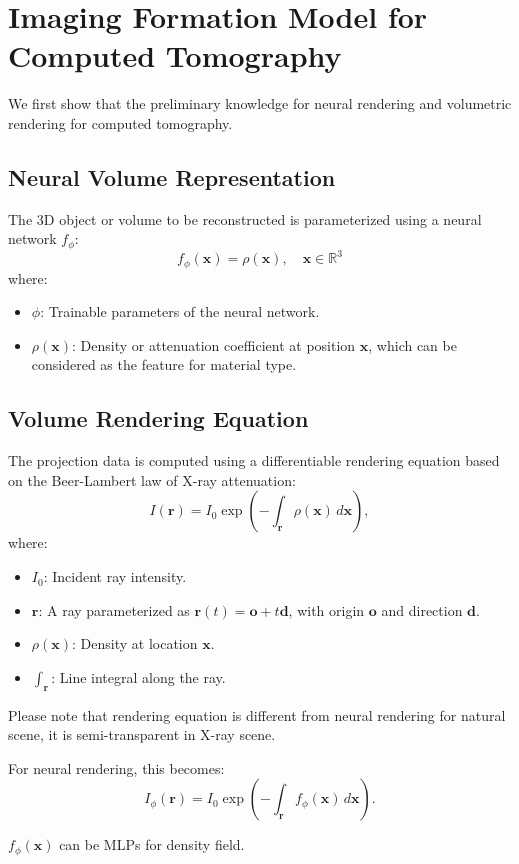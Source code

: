 \section{Imaging Formation Model for Computed Tomography}

We first show that the preliminary knowledge for neural rendering and volumetric rendering for computed tomography.
\subsection{Neural Volume Representation}
The 3D object or volume to be reconstructed is parameterized using a neural network \( f_\phi \):
\[
f_\phi(\mathbf{x}) = \rho(\mathbf{x}), \quad \mathbf{x} \in \mathbb{R}^3
\]
where:
\begin{itemize}
	\item \( \phi \): Trainable parameters of the neural network.
	\item \( \rho(\mathbf{x}) \): Density or attenuation coefficient at position \( \mathbf{x} \), which can be considered as the feature for material type.
\end{itemize}

\subsection{Volume Rendering Equation}
The projection data is computed using a differentiable rendering equation based on the Beer-Lambert law of X-ray attenuation:
\[
I(\mathbf{r}) = I_0 \exp\left( -\int_{\mathbf{r}} \rho(\mathbf{x}) \, d\mathbf{x} \right),
\]
where:
\begin{itemize}
	\item \( I_0 \): Incident ray intensity.
	\item \( \mathbf{r} \): A ray parameterized as \( \mathbf{r}(t) = \mathbf{o} + t\mathbf{d} \), with origin \( \mathbf{o} \) and direction \( \mathbf{d} \).
	\item \( \rho(\mathbf{x}) \): Density at location \( \mathbf{x} \).
	\item \( \int_{\mathbf{r}} \): Line integral along the ray.
\end{itemize}
Please note that rendering equation is different from neural rendering for natural scene, it is semi-transparent in X-ray scene.

For neural rendering, this becomes:
\[
I_\phi(\mathbf{r}) = I_0 \exp\left( -\int_{\mathbf{r}} f_\phi(\mathbf{x}) \, d\mathbf{x} \right).
\]

$f_\phi(\mathbf{x})$ can be MLPs for density field.

